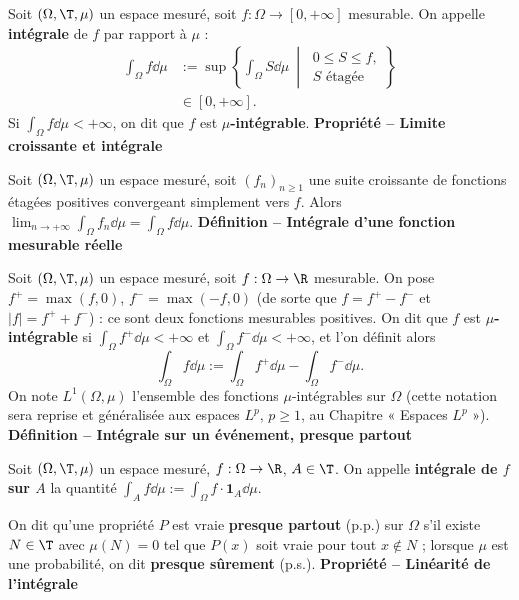 Soit $(\Omega,\T,\mu)$ un espace mesuré, soit $f:\Omega\to[0,+\infty]$ mesurable. On appelle \textbf{intégrale} de $f$ par rapport à $\mu$ :
\[
\begin{aligned}
\int_\Omega f\dd\mu
&:=\sup\left\{\int_\Omega S\dd\mu\ \middle|\ \begin{gathered}0\le S\le f,\\S\text{ étagée}\end{gathered}\right\}\\
&\in[0,+\infty].
\end{aligned}
\]
Si $\int_\Omega f\dd\mu<+\infty$, on dit que $f$ est \textbf{$\mu$-intégrable}.
\textbf{Propriété – Limite croissante et intégrale}

Soit $(\Omega,\T,\mu)$ un espace mesuré, soit $(f_n)_{n\ge1}$ une suite croissante de fonctions étagées positives convergeant simplement vers $f$. Alors $\lim_{n\to+\infty}\int_\Omega f_n\dd\mu=\int_\Omega f\dd\mu$.
\textbf{Définition – Intégrale d’une fonction mesurable réelle}

Soit $(\Omega,\T,\mu)$ un espace mesuré, soit $f:\Omega\to\R$ mesurable. On pose $f^+=\max(f,0)$, $f^-=\max(-f,0)$ (de sorte que $f=f^+-f^-$ et $|f|=f^++f^-$) : ce sont deux fonctions mesurables positives. On dit que $f$ est \textbf{$\mu$-intégrable} si $\int_\Omega f^+\dd\mu<+\infty$ et $\int_\Omega f^-\dd\mu<+\infty$, et l’on définit alors
\[\int_\Omega f\dd\mu:=\int_\Omega f^+\dd\mu-\int_\Omega f^-\dd\mu.\]
On note $L^1(\Omega,\mu)$ l’ensemble des fonctions $\mu$-intégrables sur $\Omega$ (cette notation sera reprise et généralisée aux espaces $L^p$, $p\ge1$, au Chapitre « Espaces $L^p$ »).
\textbf{Définition – Intégrale sur un événement, presque partout}

Soit $(\Omega,\T,\mu)$ un espace mesuré, $f:\Omega\to\R$, $A\in\T$. On appelle \textbf{intégrale de $f$ sur $A$} la quantité $\int_A f\dd\mu:=\int_\Omega f\cdot\mathbf1_A\dd\mu$.

On dit qu’une propriété $P$ est vraie \textbf{presque partout} (p.p.) sur $\Omega$ s’il existe $N\in\T$ avec $\mu(N)=0$ tel que $P(x)$ soit vraie pour tout $x\notin N$ ; lorsque $\mu$ est une probabilité, on dit \textbf{presque sûrement} (p.s.).
\textbf{Propriété – Linéarité de l’intégrale}

